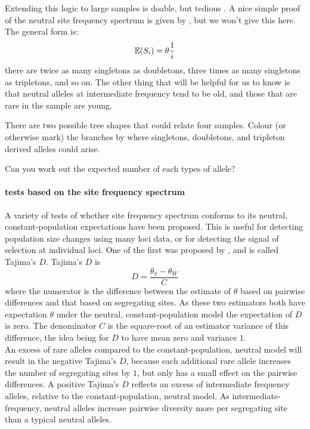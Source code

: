 Extending this logic to large samples is doable, but tedious
. A nice
simple proof of the neutral site frequency spectrum is given by
\citeauthor{Hudson:15}, but we won't give this here. The general form is: 
\begin{equation}
\mathbb{E}(S_i) = \theta \frac{1}{i}   \label{eqn:neutral_freq_spec}
\end{equation}
there are twice as many singletons as doubletons, three times as many
singletons as tripletons, and so on. The other thing that will be
helpful for us to know is that neutral alleles at intermediate frequency tend to be old, and
those that are rare in the sample are young.

\begin{question}
There are two possible tree shapes that could relate four
samples. Colour (or otherwise mark) the branches by where singletons,
doubletons, and tripleton derived alleles could arise. 

Can you work out the expected number of each types of allele?
\end{question}


\paragraph{tests based on the site frequency spectrum}
A variety of tests of whether site frequency spectrum conforms to its
neutral, constant-population expectations have been proposed. This is
useful for detecting population size changes using many loci data, or
for detecting the signal of selection at individual loci. One of
the first was proposed by \citeauthor{tajima:89}, and is called
Tajima's $D$. Tajima's $D$ is
\begin{equation}
  D = \frac{\theta_{\pi}-\theta_{W}}{C} \label{eqn_Tajimas_D}
\end{equation}
where the numerator is the difference between the estimate of
$\theta$ based on pairwise differences and that based on segregating
sites. As these two estimators both have expectation $\theta$ under
the neutral, constant-population model the expectation of $D$ is zero. The denominator $C$ is the square-root of an estimator
variance of this difference, the idea being for $D$ to have mean zero
and variance $1$. \\

An excess of rare alleles compared to the constant-population, neutral
model will result in the negative Tajima's $D$, because each
additional rare allele increases the number of segregating sites by
$1$, but only has a small effect on the pairwise differences. 
A positive Tajima's $D$ reflects an excess of intermediate frequency alleles, relative to
the  constant-population, neutral model. As intermediate-frequency, neutral alleles increase pairwise diversity
more per segregating site than a typical neutral alleles.


